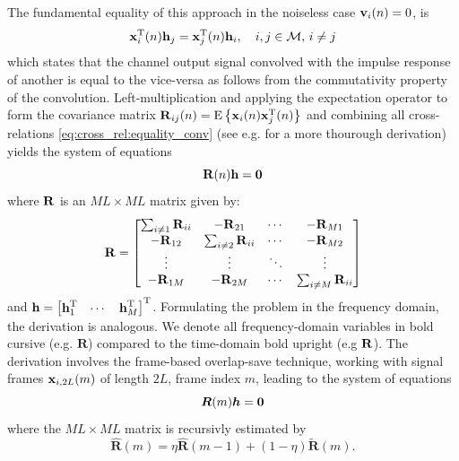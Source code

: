 \documentclass{article}
\newcommand{\h}{\mtxb{h}}
\newcommand{\x}{\mtxb{x}}
\newcommand{\R}{\mtxb{R}}
\newcommand{\hf}{{\bm{h}}}
\newcommand{\Rf}{{\bm{{R}}}}
\newcommand{\Mset}{\mathcal{M}}
\begin{document}
The fundamental equality of this approach in the noiseless case \(\bm{\mathrm{v}}_i(n) = 0\), is 
\begin{equation}
    \x_i^{\T}(n) \h_j = \x_j^{\T}(n) \h_i,\quad i,j \in \Mset,\,i\neq j\label{eq:cross_rel:equality_conv}
\end{equation}
which states that the channel output signal convolved with the impulse response of another is equal to the vice-versa as follows from the commutativity property of the convolution.
Left-multiplication and applying the expectation operator to form the covariance matrix \(\R_{ij}(n) = \ev{\x_i(n) \x_j^\T(n)}\) and combining all cross-relations \eqref{eq:cross_rel:equality_conv} (see e.g. \cite{huangAdaptiveMultichannelLeast2002} for a more thourough derivation) yields the system of equations  
\begin{equation}
    \R(n) \h = \bm{0} \label{eq:cross_rel:null_space}\\
\end{equation}
where \(\R\) is an \(M L \times M L\) matrix given by:
\begin{equation}
    \R = \begin{bmatrix}
        \sum_{i \neq 1} \R_{ii} & -\R_{21} & \cdots & -\R_{M1}\\
        -\R_{12} & \sum_{i \neq 2} \R_{ii} & \cdots & -\R_{M2}\\
        \vdots & \vdots & \ddots & \vdots\\
        -\R_{1M} & -\R_{2M} & \cdots & \sum_{i \neq M} \R_{ii}\\
    \end{bmatrix}\label{eq:cross_rel:data_matrix}
\end{equation}
and \(\h = \begin{bmatrix}
    \h_1^\T & \cdots & \h_M^\T
\end{bmatrix}^\T\).
Formulating the problem in the frequency domain, the derivation is analogous. We denote all frequency-domain variables in bold cursive (e.g. \(\Rf\)) compared to the time-domain bold upright (e.g \(\R\)). The derivation involves the frame-based overlap-save technique, working with signal frames \(\x_{i,2L}(m)\) of length \(2L\), frame index \(m\), leading to the system of equations 
\begin{equation}
    \Rf(m) \hf = \bm{0} \label{eq:frequency_domain:null_space}\\
\end{equation}
where the \(M L \times M L\) matrix is recursivly estimated by \begin{equation}
    \hat{\Rf}(m) = \eta \hat{\Rf}(m-1) + (1-\eta )\tilde{\Rf}(m).
\end{equation}
\end{document}

